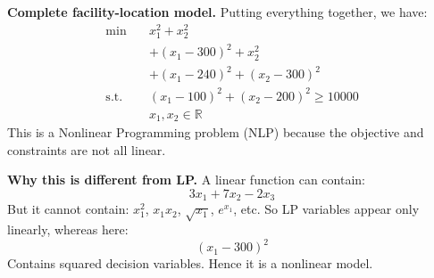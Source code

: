 \begin{examplebox}
    \highspace
    \textcolor{Green3}{ \textbf{Complete facility-location model.}} Putting everything together, we have:
    \begin{equation*}
        \boxed{
            \begin{aligned}
                \min\quad&
                x_1^2+x_2^2\\
                &+(x_1-300)^2+x_2^2\\
                &+(x_1-240)^2+(x_2-300)^2\\[1mm]
                \text{s.t.}\quad&
                (x_1-100)^2+(x_2-200)^2\geq10000\\
                &x_1,x_2\in\mathbb{R}
            \end{aligned}
        }
    \end{equation*}
    This is a Nonlinear Programming problem (NLP) because the objective and constraints are not all linear.

    \highspace
    \textcolor{Green3}{ \textbf{Why this is different from LP.}} A linear function can contain:
    \begin{equation*}
        3x_1+7x_2-2x_3
    \end{equation*}
    But it cannot contain: $x_1^2$, $x_1x_2$, $\sqrt{x_1}$, $e^{x_1}$, etc. So LP variables appear only linearly, whereas here:
    \begin{equation*}
        (x_1-300)^2
    \end{equation*}
    Contains squared decision variables. Hence it is a nonlinear model.
\end{examplebox}

